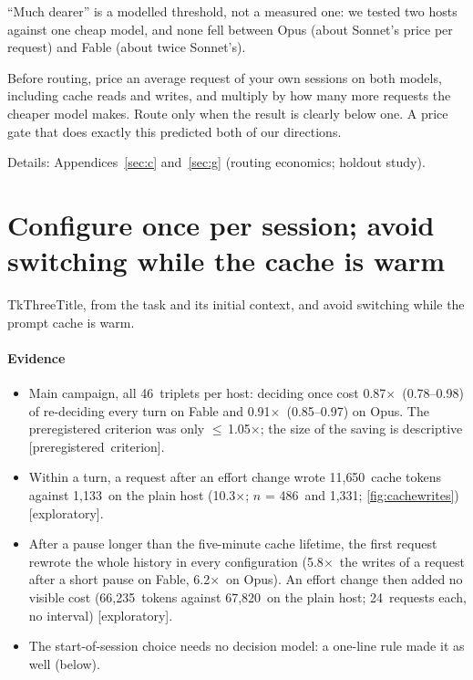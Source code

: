 \documentclass[11pt,letterpaper]{article}
\newcommand{\expl}{\mbox{\textsf{\small\color{okgray}[exploratory]}}}
\newcommand{\X}{\ensuremath{\times}}
\newcommand{\TkTitle}[1]{\csname Tk#1Title\endcsname}
\newcommand{\CwLongAnchor}{67{,}820}
\newcommand{\CwLongChanged}{66{,}235}
\newcommand{\CwLongN}{24}
\newcommand{\CwWithinAnchor}{1{,}133}
\newcommand{\CwWithinAnchorN}{1{,}331}
\newcommand{\CwWithinChanged}{11{,}650}
\newcommand{\CwWithinChangedN}{486}
\newcommand{\CwWithinX}{10.3}
\newcommand{\GapWriteFableX}{5.8}
\newcommand{\GapWriteOpusX}{6.2}
\newcommand{\HThreeFableArmCI}{0.78--0.98}
\newcommand{\HThreeFableArmN}{46}
\newcommand{\HThreeFableArmTwo}{0.87}
\newcommand{\HThreeOpusArmCI}{0.85--0.97}
\newcommand{\HThreeOpusArmTwo}{0.91}
\newcommand{\HThreeUpper}{1.05}
\newcommand{\StSecs}[2]{Appendices~\ref{#1} and~\ref{#2}}
\begin{document}
``Much dearer'' is a modelled threshold, not a measured one: we tested two hosts against one cheap model, and none fell between Opus (about Sonnet's price per request) and Fable (about twice Sonnet's).

\begin{keyidea}[title={For practitioners}]
Before routing, price an average request of your own sessions on both models, including cache reads and writes, and
multiply by how many more requests the cheaper model makes. Route only when the result is clearly below one. A price
gate that does exactly this predicted both of our directions.
\end{keyidea}

Details: \StSecs{sec:c}{sec:g} (routing economics; holdout study).
\section{Configure once per session; avoid switching while the cache is warm}\label{sec:once}

\begin{claimbox}
\TkTitle{Three}, from the task and its initial context, and avoid switching while the prompt cache is warm.
\end{claimbox}

\paragraph{Evidence}
\begin{itemize}[leftmargin=1.2em]
  \item Main campaign, all \HThreeFableArmN\ triplets per host: deciding once cost \HThreeFableArmTwo\X\
    (\HThreeFableArmCI) of re-deciding every turn on Fable and \HThreeOpusArmTwo\X\ (\HThreeOpusArmCI) on Opus. The
    preregistered criterion was only $\le$\,\HThreeUpper\X; the size of the saving is descriptive
    \mbox{\textsf{\small\color{okblue}[preregistered criterion]}}.
  \item Within a turn, a request after an effort change wrote \CwWithinChanged\ cache tokens against \CwWithinAnchor\ on
    the plain host (\CwWithinX\X; $n$ = \CwWithinChangedN\ and \CwWithinAnchorN; \cref{fig:cachewrites}) \expl.
  \item After a pause longer than the five-minute cache lifetime, the first request rewrote the whole history in every
    configuration (\GapWriteFableX\X\ the writes of a request after a short pause on Fable, \GapWriteOpusX\X\ on Opus).
    An effort change then added no visible cost (\CwLongChanged\ tokens against \CwLongAnchor\ on the plain host;
    \CwLongN\ requests each, no interval) \expl.
  \item The start-of-session choice needs no decision model: a one-line rule made it as well (below).
\end{itemize}
\end{document}
